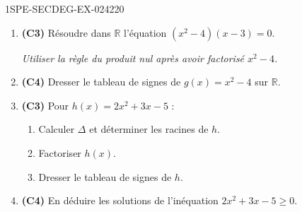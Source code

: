 \begin{exercice}{1SPE-SECDEG-EX-024}{2}{20}
\begin{enumerate}
  \item \textbf{(C3)} Résoudre dans $\mathbb{R}$ l'équation $(x^2 - 4)(x - 3) = 0$.

  \textit{Utiliser la règle du produit nul après avoir factorisé $x^2 - 4$.}

  \item \textbf{(C4)} Dresser le tableau de signes de $g(x) = x^2 - 4$ sur $\mathbb{R}$.

  \item \textbf{(C3)} Pour $h(x) = 2x^2 + 3x - 5$ :
  \begin{enumerate}
    \item Calculer $\Delta$ et déterminer les racines de $h$.
    \item Factoriser $h(x)$.
    \item Dresser le tableau de signes de $h$.
  \end{enumerate}

  \item \textbf{(C4)} En déduire les solutions de l'inéquation $2x^2 + 3x - 5 \geqslant 0$.
\end{enumerate}
\end{exercice}
